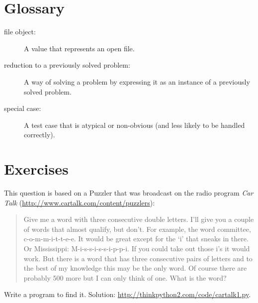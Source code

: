 \documentclass[10pt]{book}
\begin{document}
\section{Glossary}

\begin{description}

\item[file object:] A value that represents an open file.

\item[reduction to a previously solved problem:] A way of solving a
  problem by expressing it as an instance of a previously solved
  problem.  

\item[special case:] A test case that is atypical or non-obvious
(and less likely to be handled correctly).

\end{description}


\section{Exercises}

\begin{exercise}

This question is based on a Puzzler that was broadcast on the radio
program {\em Car Talk}
(\url{http://www.cartalk.com/content/puzzlers}):

\begin{quote}
Give me a word with three consecutive double letters. I'll give you a
couple of words that almost qualify, but don't. For example, the word
committee, c-o-m-m-i-t-t-e-e. It would be great except for the `i' that
sneaks in there. Or Mississippi: M-i-s-s-i-s-s-i-p-p-i. If you could
take out those i's it would work. But there is a word that has three
consecutive pairs of letters and to the best of my knowledge this may
be the only word. Of course there are probably 500 more but I can only
think of one. What is the word?
\end{quote}

Write a program to find it.
Solution: \url{http://thinkpython2.com/code/cartalk1.py}.

\end{exercise}
\end{document}
